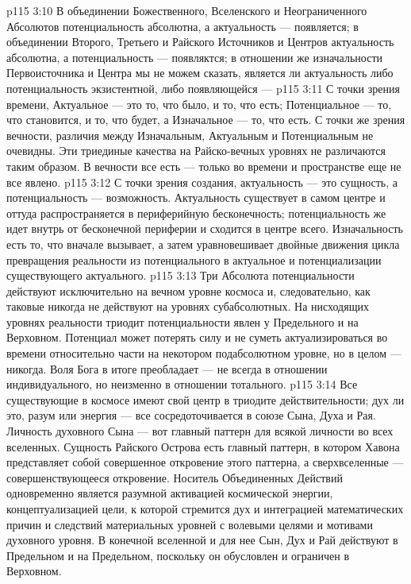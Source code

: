 \vs p115 3:10 В объединении Божественного, Вселенского и Неограниченного Абсолютов потенциальность абсолютна, а актуальность --- появляется; в объединении Второго, Третьего и Райского Источников и Центров актуальность абсолютна, а потенциальность --- появляктся; в отношении же изначальности Первоисточника и Центра мы не можем сказать, является ли актуальность либо потенциальность экзистентной, либо появляющейся --- 
\vs p115 3:11 С точки зрения времени, Актуальное --- это то, что было, и то, что есть; Потенциальное --- то, что становится, и то, что будет, а Изначальное --- то, что есть. С точки же зрения вечности, различия между Изначальным, Актуальным и Потенциальным не очевидны. Эти триединые качества на Райско\hyp{}вечных уровнях не различаются таким образом. В вечности все есть --- только во времени и пространстве еще не все явлено.
\vs p115 3:12 С точки зрения создания, актуальность --- это сущность, а потенциальность --- возможность. Актуальность существует в самом центре и оттуда распространяется в периферийную бесконечность; потенциальность же идет внутрь от бесконечной периферии и сходится в центре всего. Изначальность есть то, что вначале вызывает, а затем уравновешивает двойные движения цикла превращения реальности из потенциального в актуальное и потенциализации существующего актуального.
\vs p115 3:13 Три Абсолюта потенциальности действуют исключительно на вечном уровне космоса и, следовательно, как таковые никогда не действуют на уровнях субабсолютных. На нисходящих уровнях реальности триодит потенциальности явлен у Предельного и на Верховном. Потенциал может потерять силу и не суметь актуализироваться во времени относительно части на некотором подабсолютном уровне, но в целом --- никогда. Воля Бога в итоге преобладает --- не всегда в отношении индивидуального, но неизменно в отношении тотального.
\vs p115 3:14 Все существующие в космосе имеют свой центр в триодите действительности; дух ли это, разум или энергия --- все сосредоточивается в союзе Сына, Духа и Рая. Личность духовного Сына --- вот главный паттерн для всякой личности во всех вселенных. Сущность Райского Острова есть главный паттерн, в котором Хавона представляет собой совершенное откровение этого паттерна, а сверхвселенные --- совершенствующееся откровение. Носитель Объединенных Действий одновременно является разумной активацией космической энергии, концептуализацией цели, к которой стремится дух и интеграцией математических причин и следствий материальных уровней с волевыми целями и мотивами духовного уровня. В конечной вселенной и для нее Сын, Дух и Рай действуют в Предельном и на Предельном, поскольку он обусловлен и ограничен в Верховном.
